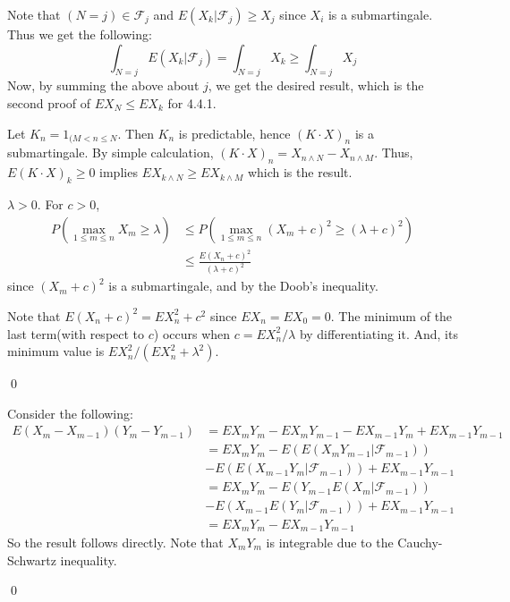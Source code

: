\begin{problem}[4.4.1] \hfill

	Note that $(N=j) \in \mathcal{F}_j$ and $E(X_k | \mathcal{F}_j) \geq X_j$ since $X_i$ is a submartingale.
	Thus we get the following:
	\[
		\int_{N = j} E(X_k | \mathcal{F}_j) = \int_{N=j} X_k \geq \int_{N=j}X_j
	\]
	Now, by summing the above about $j$, we get the desired result, which is the second proof of $EX_N \leq EX_k$ for 4.4.1.
	
\end{problem}

\begin{problem}[4.4.2] \hfill

	Let $K_n = 1_{(M<n\leq N}$. Then $K_n$ is predictable, hence $(K \cdot X)_n$ is a submartingale.
		By simple calculation, $(K \cdot X)_n = X_{n \wedge N} - X_{n \wedge M}$.
		Thus, $E(K\cdot X)_k \geq 0$ implies $EX_{k\wedge N} \geq EX_{k \wedge M}$ which is the result.
	
\end{problem}

\begin{problem}[4.4.7] \hfill

	$\lambda >0$. For $c>0$,
	\[
		\begin{split}
			P(\max_{1\leq m \leq n} X_m \geq \lambda)
			& \leq P \left ( \max_{1 \leq m \leq n} (X_m + c)^2 \geq (\lambda+c)^2 \right ) \\
			& \leq \frac{E(X_n+c)^2}{(\lambda+c)^2}
		\end{split}
	\]
	since $(X_m + c)^2$ is a submartingale, and by the Doob's inequality.

	Note that $E(X_n+c)^2 = EX_n^2 + c^2$ since $EX_n = EX_0 = 0$.
	The minimum of the last term(with respect to $c$) occurs when $c = EX_n^2 / \lambda$ by differentiating it.
	And, its minimum value is $EX_n^2 /(EX_n^2 + \lambda^2)$.

	\qed
\end{problem}

\begin{problem}[4.4.9] \hfill

	Consider the following:
	\[
		\begin{split}
			E\left( X_m -X_{m-1} \right)\left( Y_m -Y_{m-1} \right)
			& = EX_mY_m - EX_mY_{m-1} - EX_{m-1}Y_m + EX_{m-1}Y_{m-1} \\
			& = EX_mY_m - E\left( E(X_m Y_{m-1} | \mathcal{F}_{m-1}) \right) \\
			& - E\left( E(X_{m-1}Y_m | \mathcal{F}_{m-1} ) \right) + EX_{m-1}Y_{m-1} \\
			& = EX_mY_m - E\left( Y_{m-1}E(X_m | \mathcal{F}_{m-1}) \right) \\
			& - E\left( X_{m-1}E(Y_m | \mathcal{F}_{m-1}) \right) +EX_{m-1}Y_{m-1} \\
			& = EX_mY_m -EX_{m-1}Y_{m-1}
		\end{split}
	\]
	So the result follows directly.
	Note that $X_m Y_m$ is integrable due to the Cauchy-Schwartz inequality. 

	\qed
\end{problem}

